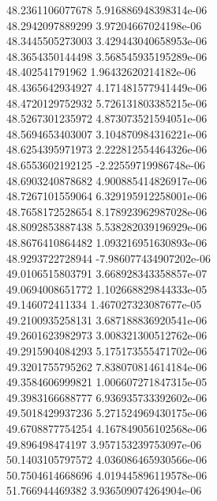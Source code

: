 {48.2361106077678 5.916886948398314e-06 \\
48.2942097889299 3.97204667024198e-06 \\
48.3445505273003 3.429443040658953e-06 \\
48.3654350144498 3.568545935195289e-06 \\
48.402541791962 1.96432620214182e-06 \\
48.4365642934927 4.171481577941449e-06 \\
48.4720129752932 5.726131803385215e-06 \\
48.5267301235972 4.873073521594051e-06 \\
48.5694653403007 3.104870984316221e-06 \\
48.6254395971973 2.222812554464326e-06 \\
48.6553602192125 -2.22559719986748e-06 \\
48.6903240878682 4.900885414826917e-06 \\
48.7267101559064 6.329195912258001e-06 \\
48.7658172528654 8.178923962987028e-06 \\
48.8092853887438 5.538282039196929e-06 \\
48.8676410864482 1.093216951630893e-06 \\
48.9293722728944 -7.986077434907202e-06 \\
49.0106515803791 3.668928343358857e-07 \\
49.0694008651772 1.102668829844333e-05 \\
49.146072411334 1.467027323087677e-05 \\
49.2100935258131 3.687188836920541e-06 \\
49.2601623982973 3.008321300512762e-06 \\
49.2915904084293 5.175173555471702e-06 \\
49.3201755795262 7.838070814614184e-06 \\
49.3584606999821 1.006607271847315e-05 \\
49.3983166688777 6.936935733392602e-06 \\
49.5018429937236 5.271524969430175e-06 \\
49.6708877754254 4.167849056102568e-06 \\
49.896498474197 3.957153239753097e-06 \\
50.1403105797572 4.036086465930566e-06 \\
50.7504614668696 4.019445896119578e-06 \\
51.766944469382 3.936509074264904e-06 \\
}

